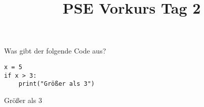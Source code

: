 \documentclass{../../sheet}
\title{PSE Vorkurs Tag 2}
\begin{document}
\maketitle

Was gibt der folgende Code aus?
\begin{verbatim}
x = 5
if x > 3:
    print("Größer als 3")
\end{verbatim}

\begin{ausgabe}
Größer als 3
\end{ausgabe}

\newpage
{}
\end{document}
